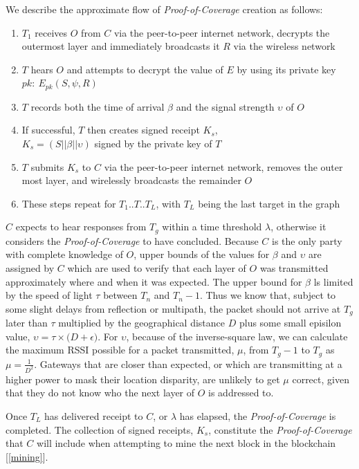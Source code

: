 \documentclass[UTF8, 10pt, nonatbib, nocopyrightspace, reprint]{sigplanconf}
\newcommand{\secref}[1]{[\autoref{#1}]}
\begin{document}
We describe the approximate flow of \emph{Proof-of-Coverage} creation as follows:

\begin{enumerate}
  \item $T_1$ receives $O$ from $C$ via the peer-to-peer internet network, decrypts the outermost layer and immediately broadcasts it $R$ via the wireless network
  \item $T$ hears $O$ and attempts to decrypt the value of $E$ by using its private key $pk:\ E_{pk}\left(S, \psi, R\right)$
  \item $T$ records both the time of arrival $\beta$ and the signal strength $\upsilon$ of $O$
  \item If successful, $T$ then creates signed receipt $K_s$, \\${K_s = \left(S || \beta || \upsilon\right)}$ signed by the private key of $T$
  \item $T$ submits $K_s$ to $C$ via the peer-to-peer internet network, removes the outer most layer, and wirelessly broadcasts the remainder $O$
  \item These steps repeat for $T_1$..$T$..$T_L$, with $T_L$ being the last target in the graph
\end{enumerate}

$C$ expects to hear responses from $T_g$ within a time threshold $\lambda$, otherwise it considers the \emph{Proof-of-Coverage} to have concluded. Because $C$ is the only party with complete knowledge of $O$, upper bounds of the values for $\beta$ and $\upsilon$ are assigned by $C$ which are used to verify that each layer of $O$ was transmitted approximately where and when it was expected. The upper bound for $\beta$ ls limited by the speed of light $\tau$ between $T_n$ and $T_n-1$. Thus we know that, subject to some slight delays from reflection or multipath, the packet should not arrive at $T_g$ later than $\tau$ multiplied by the geographical distance $D$ plus some small episilon value, $\upsilon = \tau \times \Big(D + \epsilon\Big)$. For $\upsilon$, because of the inverse-square law, we can calculate the maximum RSSI possible for a packet transmitted, $\mu$, from $T_g-1$ to $T_g$ as $\mu = \frac{1}{D^2}$. Gateways that are closer than expected, or which are transmitting at a higher power to mask their location disparity, are unlikely to get $\mu$ correct, given that they do not know who the next layer of $O$ is addressed to.

Once $T_L$ has delivered receipt to $C$, or $\lambda$ has elapsed, the \emph{Proof-of-Coverage} is completed. The collection of signed receipts, $K_s$, constitute the \emph{Proof-of-Coverage} that $C$ will include when attempting to mine the next block in the blockchain \secref{mining}.
\end{document}
